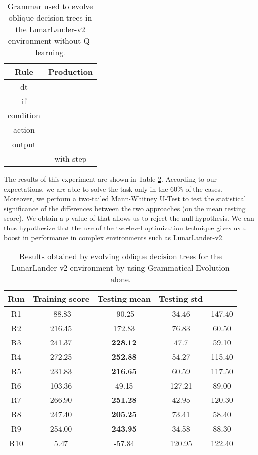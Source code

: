 \documentclass[review,english]{elsarticle}
\begin{document}
\begin{table}
    \centering
    \begin{tabular}{|c|c|} \hline
        \textbf{Rule} & \textbf{Production} \\ \hline
        dt &  \\ if &  \\ condition &  \\ action &  \\ output &  \\  &  with step  \\ \hline
    \end{tabular}
    \caption{Grammar used to evolve oblique decision trees in the LunarLander-v2 environment without Q-learning.}
    \label{tab:ll_abl_obl_grammar}
\end{table}

The results of this experiment are shown in Table \ref{tab:ll_abl_obl_results}.
According to our expectations, we are able to solve the task only in the 60\% of the cases.
Moreover, we perform a two-tailed Mann-Whitney U-Test to test the statistical significance of the differences between the two approaches (on the mean testing score).
We obtain a p-value of  that allows us to reject the null hypothesis.
We can thus hypothesize that the use of the two-level optimization technique gives us a boost in performance in complex environments such as LunarLander-v2.

\begin{table}[ht]
    \centering
    \begin{tabular}{|c|c|c|c|c|} \hline
    \textbf{Run} & \textbf{Training score} & \textbf{Testing mean} & \textbf{Testing std} & \textbf{} \\ \hline
    R1 & -88.83 & -90.25 & 34.46 & 147.40 \\ R2 & 216.45 & 172.83 & 76.83 & 60.50 \\ R3 & 241.37 & \textbf{228.12} & 47.7 & 59.10 \\ R4 & 272.25 & \textbf{252.88} & 54.27 & 115.40 \\ R5 & 231.83 & \textbf{216.65} & 60.59 & 117.50 \\ R6 & 103.36 & 49.15 & 127.21 & 89.00 \\ R7 & 266.90 & \textbf{251.28} & 42.95 & 120.30 \\ R8 & 247.40 & \textbf{205.25} & 73.41 & 58.40 \\ R9 & 254.00 & \textbf{243.95} & 34.58 & 88.30 \\ R10 & 5.47 & -57.84 & 120.95 & 122.40 \\ \hline
    \end{tabular}
    \caption{Results obtained by evolving oblique decision trees for the LunarLander-v2 environment by using Grammatical Evolution alone.}
    \label{tab:ll_abl_obl_results}
\end{table}
\end{document}
